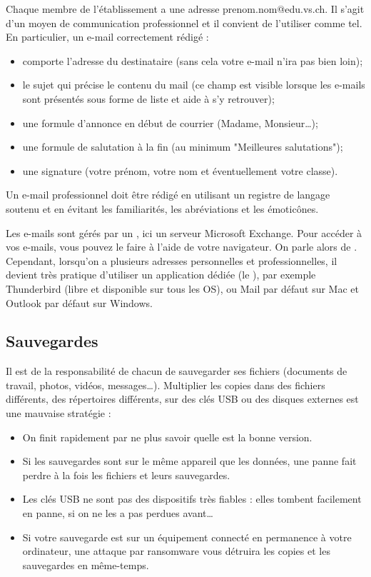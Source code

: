 \documentclass[10pt,a4paper]{report}
\begin{document}
Chaque membre de l'établissement a une adresse prenom.nom@edu.vs.ch. Il s'agit d'un moyen de communication professionnel et il convient de l'utiliser comme tel. En particulier, un e-mail correctement rédigé :
\begin{itemize}
	\item comporte l'adresse du destinataire (sans cela votre e-mail n'ira pas bien loin);
	\item le sujet qui précise le contenu du mail (ce champ est visible lorsque les e-mails sont présentés sous forme de liste et aide à s'y retrouver);
	\item une formule d'annonce en début de courrier (Madame, Monsieur\dots);
	\item une formule de salutation à la fin (au minimum "Meilleures salutations");
	\item une signature (votre prénom, votre nom et éventuellement votre classe).
\end{itemize}

Un e-mail professionnel doit être rédigé en utilisant un registre de langage soutenu et en évitant les familiarités, les abréviations et les émoticônes.

Les e-mails sont gérés par un , ici un serveur Microsoft Exchange. Pour accéder à vos e-mails, vous pouvez le faire à l'aide de votre navigateur. On parle alors de . Cependant, lorsqu'on a plusieurs adresses personnelles et professionnelles, il devient très pratique d'utiliser un application dédiée (le ), par exemple Thunderbird (libre et disponible sur tous les OS), ou Mail par défaut sur Mac et Outlook par défaut sur Windows.




\subsection{Sauvegardes}

Il est de la responsabilité de chacun de sauvegarder ses fichiers (documents de travail, photos, vidéos, messages\dots). Multiplier les copies dans des fichiers différents, des répertoires différents, sur des clés USB ou des disques externes est une mauvaise stratégie : 
\begin{itemize}
	\item On finit rapidement par ne plus savoir quelle est la bonne version.
	\item Si les sauvegardes sont sur le même appareil que les données, une panne fait perdre à la fois les fichiers et leurs sauvegardes.
	\item Les clés USB ne sont pas des dispositifs très fiables : elles tombent facilement en panne, si on ne les a pas perdues avant\dots
	\item Si votre sauvegarde est sur un équipement connecté en permanence à votre ordinateur, une attaque par ransomware vous détruira les copies et les sauvegardes en même-temps.
\end{itemize}
\end{document}
